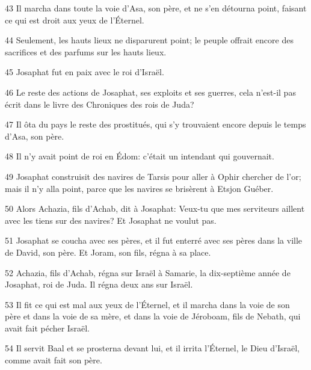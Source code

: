 \par 43 Il marcha dans toute la voie d'Asa, son père, et ne s'en détourna point, faisant ce qui est droit aux yeux de l'Éternel.
\par 44 Seulement, les hauts lieux ne disparurent point; le peuple offrait encore des sacrifices et des parfums sur les hauts lieux.
\par 45 Josaphat fut en paix avec le roi d'Israël.
\par 46 Le reste des actions de Josaphat, ses exploits et ses guerres, cela n'est-il pas écrit dans le livre des Chroniques des rois de Juda?
\par 47 Il ôta du pays le reste des prostitués, qui s'y trouvaient encore depuis le temps d'Asa, son père.
\par 48 Il n'y avait point de roi en Édom: c'était un intendant qui gouvernait.
\par 49 Josaphat construisit des navires de Tarsis pour aller à Ophir chercher de l'or; mais il n'y alla point, parce que les navires se brisèrent à Etsjon Guéber.
\par 50 Alors Achazia, fils d'Achab, dit à Josaphat: Veux-tu que mes serviteurs aillent avec les tiens sur des navires? Et Josaphat ne voulut pas.
\par 51 Josaphat se coucha avec ses pères, et il fut enterré avec ses pères dans la ville de David, son père. Et Joram, son fils, régna à sa place.
\par 52 Achazia, fils d'Achab, régna sur Israël à Samarie, la dix-septième année de Josaphat, roi de Juda. Il régna deux ans sur Israël.
\par 53 Il fit ce qui est mal aux yeux de l'Éternel, et il marcha dans la voie de son père et dans la voie de sa mère, et dans la voie de Jéroboam, fils de Nebath, qui avait fait pécher Israël.
\par 54 Il servit Baal et se prosterna devant lui, et il irrita l'Éternel, le Dieu d'Israël, comme avait fait son père.


